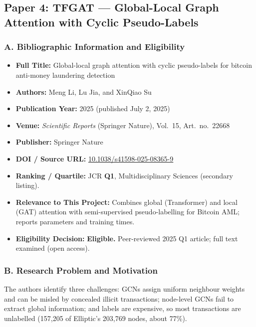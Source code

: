 \documentclass[11pt,a4paper]{article}
\begin{document}
\subsection{Paper 4: TFGAT --- Global-Local Graph Attention with Cyclic Pseudo-Labels}
\label{sec:p4_tfgat}

\subsubsection*{A. Bibliographic Information and Eligibility}
\begin{itemize}[leftmargin=*]
    \item \textbf{Full Title:} Global-local graph attention with cyclic pseudo-labels for bitcoin anti-money laundering detection
    \item \textbf{Authors:} Meng Li, Lu Jia, and XinQiao Su
    \item \textbf{Publication Year:} 2025 (published July 2, 2025)
    \item \textbf{Venue:} \textit{Scientific Reports} (Springer Nature), Vol.~15, Art.\ no.\ 22668
    \item \textbf{Publisher:} Springer Nature
    \item \textbf{DOI / Source URL:} \href{https://doi.org/10.1038/s41598-025-08365-9}{10.1038/s41598-025-08365-9}
    \item \textbf{Ranking / Quartile:} JCR \textbf{Q1}, Multidisciplinary Sciences (secondary listing).
    \item \textbf{Relevance to This Project:} Combines global (Transformer) and local (GAT) attention with semi-supervised pseudo-labelling for Bitcoin AML; reports parameters and training times.
    \item \textbf{Eligibility Decision:} \textbf{Eligible.} Peer-reviewed 2025 Q1 article; full text examined (open access).
\end{itemize}

\subsubsection*{B. Research Problem and Motivation}
The authors identify three challenges: GCNs assign uniform neighbour weights and can be misled by concealed illicit transactions; node-level GCNs fail to extract global information; and labels are expensive, so most transactions are unlabelled (157,205 of Elliptic's 203,769 nodes, about 77\%).
\end{document}
